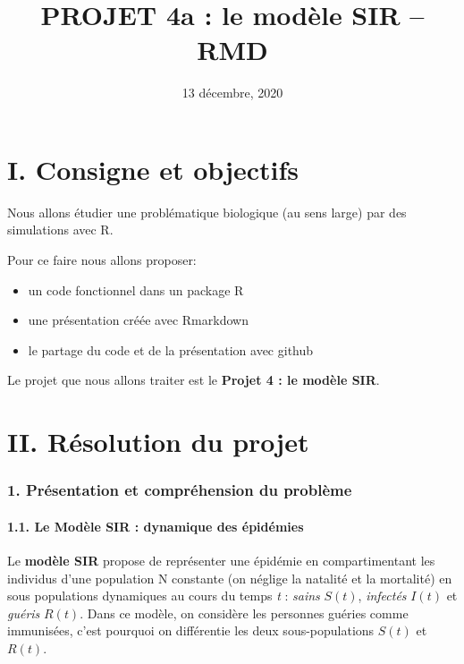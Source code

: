 \documentclass[
]{article}
\title{PROJET 4a : le modèle SIR -- RMD}
\author{}
\date{\vspace{-2.5em}13 décembre, 2020}
\begin{document}
\maketitle

\hypertarget{i.-consigne-et-objectifs}{%
\section{I. Consigne et objectifs}\label{i.-consigne-et-objectifs}}

Nous allons étudier une problématique biologique (au sens large) par des
simulations avec R.

Pour ce faire nous allons proposer:

\begin{itemize}
\item
  un code fonctionnel dans un package R
\item
  une présentation créée avec Rmarkdown
\item
  le partage du code et de la présentation avec github
\end{itemize}

Le projet que nous allons traiter est le \textbf{Projet 4 : le modèle
SIR}.

\hypertarget{ii.-ruxe9solution-du-projet}{%
\section{II. Résolution du projet}\label{ii.-ruxe9solution-du-projet}}

\hypertarget{pruxe9sentation-et-compruxe9hension-du-probluxe8me}{%
\subsubsection{1. Présentation et compréhension du
problème}\label{pruxe9sentation-et-compruxe9hension-du-probluxe8me}}

\hypertarget{le-moduxe8le-sir-dynamique-des-uxe9piduxe9mies}{%
\paragraph{1.1. Le Modèle SIR : dynamique des
épidémies}\label{le-moduxe8le-sir-dynamique-des-uxe9piduxe9mies}}

Le \textbf{modèle SIR} propose de représenter une épidémie en
compartimentant les individus d'une population N constante (on néglige
la natalité et la mortalité) en sous populations dynamiques au cours du
temps \emph{t} : \emph{sains} \textbf{\(S(t)\)}, \emph{infectés}
\textbf{\(I(t)\)} et \emph{guéris} \textbf{\(R(t)\)}. Dans ce modèle, on
considère les personnes guéries comme immunisées, c'est pourquoi on
différentie les deux sous-populations \(S(t)\) et \(R(t)\).
\end{document}
